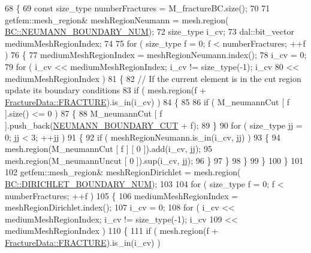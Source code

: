 \begin{DoxyCode}
68 \{
69     \textcolor{keyword}{const} size\_type numberFractures = M\_fractureBC.size();
70 
71     getfem::mesh\_region& meshRegionNeumann = mesh.region(
      \hyperlink{classBC_ad1b507696802f73b95c0ca59f4c41390a432aa77a00d8eb4929463ef8d57b5c04}{BC::NEUMANN\_BOUNDARY\_NUM});
72     size\_type i\_cv;
73     dal::bit\_vector mediumMeshRegionIndex;
74 
75     \textcolor{keywordflow}{for} ( size\_type f = 0; f < numberFractures; ++f )
76     \{
77         mediumMeshRegionIndex = meshRegionNeumann.index();
78         i\_cv = 0;
79         \textcolor{keywordflow}{for} ( i\_cv << mediumMeshRegionIndex; i\_cv != size\_type(-1); i\_cv
80                 << mediumMeshRegionIndex )
81         \{
82             \textcolor{comment}{// If the current element is in the cut region update its boundary conditions}
83             \textcolor{keywordflow}{if} ( mesh.region(f + \hyperlink{classFractureData_aaeea1f30482432d159eda9d98beb5e89a351538e4c78b34b5c0416e21903e1812}{FractureData::FRACTURE}).is\_in(i\_cv) )
84             \{
85 
86                 \textcolor{keywordflow}{if} ( M\_neumannCut [ f ].size() <= 0 )
87                 \{
88                     M\_neumannCut [ f ].push\_back(\hyperlink{classBCHandler_a2bc86209db0836dbc6ca56e1ca4e4ac1add7397a06718591b0c27c067225b1d5f}{NEUMANN\_BOUNDARY\_CUT} + f);
89                 \}
90                 \textcolor{keywordflow}{for} ( size\_type jj = 0; jj < 3; ++jj )
91                 \{
92                     \textcolor{keywordflow}{if} ( meshRegionNeumann.is\_in(i\_cv, jj) )
93                     \{
94                         mesh.region(M\_neumannCut [ f ] [ 0 ]).add(i\_cv, jj);
95                         mesh.region(M\_neumannUncut [ 0 ]).sup(i\_cv, jj);
96                     \}
97                 \}
98             \}
99         \}
100     \}
101 
102     getfem::mesh\_region& meshRegionDirichlet = mesh.region(
      \hyperlink{classBC_ad1b507696802f73b95c0ca59f4c41390a99103ccd54ba29b1bd2670cc6cd0c462}{BC::DIRICHLET\_BOUNDARY\_NUM});
103 
104     \textcolor{keywordflow}{for} ( size\_type f = 0; f < numberFractures; ++f )
105     \{
106         mediumMeshRegionIndex = meshRegionDirichlet.index();
107         i\_cv = 0;
108         \textcolor{keywordflow}{for} ( i\_cv << mediumMeshRegionIndex; i\_cv != size\_type(-1); i\_cv
109                 << mediumMeshRegionIndex )
110         \{
111             \textcolor{keywordflow}{if} ( mesh.region(f + \hyperlink{classFractureData_aaeea1f30482432d159eda9d98beb5e89a351538e4c78b34b5c0416e21903e1812}{FractureData::FRACTURE}).is\_in(i\_cv) )

\end{DoxyCode}
